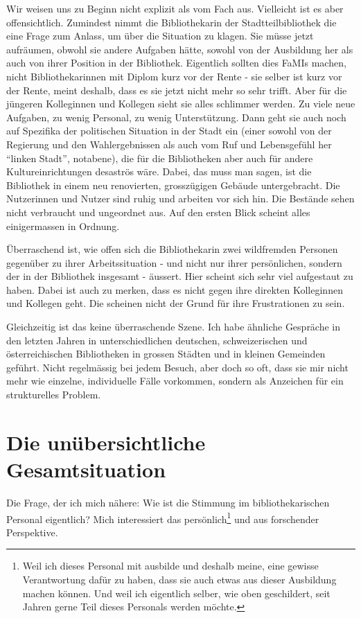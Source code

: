 \documentclass[a4paper,
fontsize=11pt,
oneside,
numbers=noperiodatend,
parskip=half-,
bibliography=totoc,
final
]{scrartcl}
\begin{document}
Wir weisen uns zu Beginn nicht explizit als vom Fach aus. Vielleicht ist
es aber offensichtlich. Zumindest nimmt die Bibliothekarin der
Stadtteilbibliothek die eine Frage zum Anlass, um über die Situation zu
klagen. Sie müsse jetzt aufräumen, obwohl sie andere Aufgaben hätte,
sowohl von der Ausbildung her als auch von ihrer Position in der
Bibliothek. Eigentlich sollten dies FaMIs machen, nicht
Bibliothekarinnen mit Diplom kurz vor der Rente - sie selber ist kurz
vor der Rente, meint deshalb, dass es sie jetzt nicht mehr so sehr
trifft. Aber für die jüngeren Kolleginnen und Kollegen sieht sie alles
schlimmer werden. Zu viele neue Aufgaben, zu wenig Personal, zu wenig
Unterstützung. Dann geht sie auch noch auf Spezifika der politischen
Situation in der Stadt ein (einer sowohl von der Regierung und den
Wahlergebnissen als auch vom Ruf und Lebensgefühl her \enquote{linken
Stadt}, notabene), die für die Bibliotheken aber auch für andere
Kultureinrichtungen desaströs wäre. Dabei, das muss man sagen, ist die
Bibliothek in einem neu renovierten, grosszügigen Gebäude untergebracht.
Die Nutzerinnen und Nutzer sind ruhig und arbeiten vor sich hin. Die
Bestände sehen nicht verbraucht und ungeordnet aus. Auf den ersten Blick
scheint alles einigermassen in Ordnung.

Überraschend ist, wie offen sich die Bibliothekarin zwei wildfremden
Personen gegenüber zu ihrer Arbeitssituation - und nicht nur ihrer
persönlichen, sondern der in der Bibliothek insgesamt - äussert. Hier
scheint sich sehr viel aufgestaut zu haben. Dabei ist auch zu merken,
dass es nicht gegen ihre direkten Kolleginnen und Kollegen geht. Die
scheinen nicht der Grund für ihre Frustrationen zu sein.

Gleichzeitig ist das keine überraschende Szene. Ich habe ähnliche
Gespräche in den letzten Jahren in unterschiedlichen deutschen,
schweizerischen und österreichischen Bibliotheken in grossen Städten und
in kleinen Gemeinden geführt. Nicht regelmässig bei jedem Besuch, aber
doch so oft, dass sie mir nicht mehr wie einzelne, individuelle Fälle
vorkommen, sondern als Anzeichen für ein strukturelles Problem.

\hypertarget{die-unuxfcbersichtliche-gesamtsituation}{%
\section*{Die unübersichtliche
Gesamtsituation}\label{die-unuxfcbersichtliche-gesamtsituation}}

Die Frage, der ich mich nähere: Wie ist die Stimmung im
bibliothekarischen Personal eigentlich? Mich interessiert das
persönlich\footnote{Weil ich dieses Personal mit ausbilde und deshalb
  meine, eine gewisse Verantwortung dafür zu haben, dass sie auch etwas
  aus dieser Ausbildung machen können. Und weil ich eigentlich selber,
  wie oben geschildert, seit Jahren gerne Teil dieses Personals werden
  möchte.} und aus forschender Perspektive.
\end{document}
